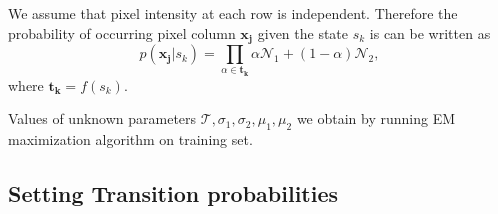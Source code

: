 \documentclass[a4paper,12pt]{article}
\newcounter{ohNoteCounter}
\newcommand{\ohnote}[1]{{\scriptsize  \color{Cgreen} $\clubsuit$~\refstepcounter{ohNoteCounter}\textsf{[OH]$_{\arabic{ohNoteCounter}}$:{#1}}}}
\renewcommand{\ohnote}[1]{}
\begin{document}
  We assume that pixel intensity at each row is independent. Therefore the probability of occurring pixel column $\mathbf{x_j}$ given the state $s_k$ is can be written as 
  	\[
	p(\mathbf{x_j}|s_k) =   \prod_{\alpha \in \mathbf{t_k}}  \alpha  \mathcal{N}_1 +  (1-\alpha) \mathcal{N}_2,
	\]
where $\mathbf{t_k} = f(s_k)$. 

Values of unknown parameters $\mathcal{T}, \sigma_1, \sigma_2, \mu_1, \mu_2$ we obtain by running EM maximization algorithm on training set. 
\ohnote{Describe usage of EM alg.}


  \subsection{Setting Transition probabilities}
\end{document}
